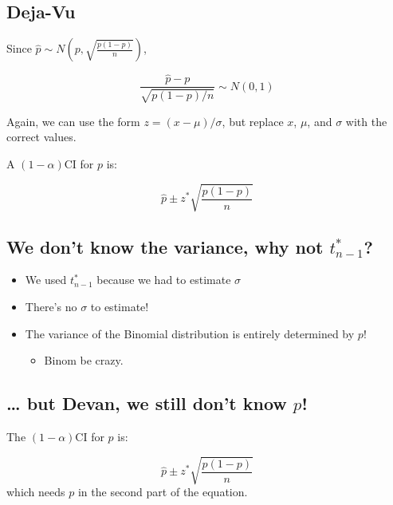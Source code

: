 \documentclass[
  letterpaper,
  DIV=11,
  numbers=noendperiod]{scrreprt}
\providecommand{\tightlist}{%
  \setlength{\itemsep}{0pt}\setlength{\parskip}{0pt}}\usepackage{longtable,booktabs,array}
\def\pause{}
\begin{document}
\hypertarget{deja-vu}{%
\subsection{Deja-Vu}\label{deja-vu}}

Since \(\hat p \sim N(p, \sqrt{\frac{p(1-p)}{n}})\),

\[
\frac{\hat p - p}{\sqrt{p(1-p)/n}} \sim N(0,1)
\]

\pause Again, we can use the form \(z = (x-\mu)/\sigma\), but replace
\(x\), \(\mu\), and \(\sigma\) with the correct values.\pause

A \((1-\alpha)\)CI for \(p\) is:

\[
\hat p \pm z^*\sqrt{\frac{p(1-p)}{n}}
\]

\hypertarget{we-dont-know-the-variance-why-not-t_n-1}{%
\subsection{\texorpdfstring{We don't know the variance, why not
\(t_{n-1}^*\)?}{We don't know the variance, why not t\_\{n-1\}\^{}*?}}\label{we-dont-know-the-variance-why-not-t_n-1}}

\begin{itemize}
\item
  We used \(t_{n-1}^*\) because we had to estimate \(\sigma\)\newline
\item
  There's no \(\sigma\) to estimate!\newline
\item
  The variance of the Binomial distribution is entirely determined by
  \(p\)!

  \begin{itemize}
  \tightlist
  \item
    Binom be crazy.
  \end{itemize}
\end{itemize}

\hypertarget{but-devan-we-still-dont-know-p}{%
\subsection{\texorpdfstring{\ldots{} but Devan, we still don't know
\(p\)!}{\ldots{} but Devan, we still don't know p!}}\label{but-devan-we-still-dont-know-p}}

The \((1-\alpha)\)CI for \(p\) is:

\[
\hat p \pm z^*\sqrt{\frac{p(1-p)}{n}}
\] which needs \(p\) in the second part of the equation.\pause
\end{document}
